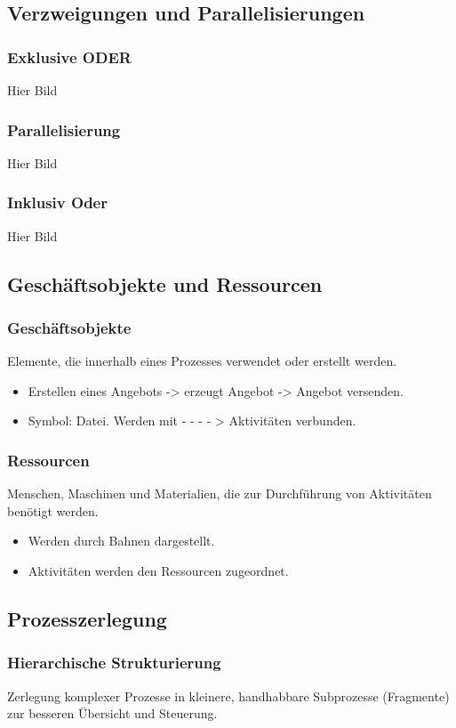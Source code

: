 \subsection{Verzweigungen und Parallelisierungen}
    \subsubsection*{Exklusive ODER}
        Hier Bild
    \subsubsection*{Parallelisierung}
        Hier Bild
    \subsubsection*{Inklusiv Oder}
        Hier Bild

\subsection{Geschäftsobjekte und Ressourcen}
    \subsubsection*{Geschäftsobjekte}
        Elemente, die innerhalb eines Prozesses verwendet oder erstellt werden. 
        \begin{itemize}
            \item Erstellen eines Angebots -> erzeugt Angebot -> Angebot versenden. 
            \item Symbol: Datei. Werden mit - - - - > Aktivitäten verbunden.
        \end{itemize}
    \subsubsection*{Ressourcen}
        Menschen, Maschinen und Materialien, die zur Durchführung von Aktivitäten benötigt werden. 
        \begin{itemize}
            \item Werden durch Bahnen dargestellt.
            \item Aktivitäten werden den Ressourcen zugeordnet.
        \end{itemize}

\subsection{Prozesszerlegung}
    \subsubsection*{Hierarchische Strukturierung}
        Zerlegung komplexer Prozesse in kleinere, handhabbare Subprozesse (Fragmente) zur besseren Übersicht und Steuerung.
